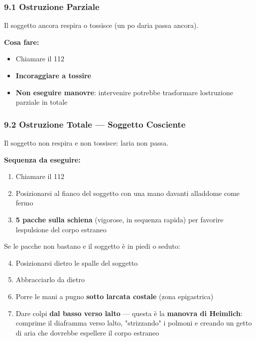 \documentclass[a4paper,11pt]{article}
\providecommand{\tightlist}{%
  \setlength{\itemsep}{0pt}\setlength{\parskip}{0pt}}
\begin{document}
\subsubsection{9.1 Ostruzione Parziale}\label{ostruzione-parziale}

Il soggetto ancora respira o tossisce (un po\textquotesingle{}
d\textquotesingle aria passa ancora).

\textbf{Cosa fare:}

\begin{itemize}
      \tightlist
      \item
            Chiamare il 112
      \item
            \textbf{Incoraggiare a tossire}
      \item
            \textbf{Non eseguire manovre}: intervenire potrebbe trasformare
            l\textquotesingle ostruzione parziale in totale
\end{itemize}

\subsubsection{9.2 Ostruzione Totale --- Soggetto
      Cosciente}\label{ostruzione-totale-soggetto-cosciente}

Il soggetto non respira e non tossisce: l\textquotesingle aria non
passa.

\textbf{Sequenza da eseguire:}

\begin{enumerate}
      \tightlist
      \item
            Chiamare il 112
      \item
            Posizionarsi al fianco del soggetto con una mano davanti
            all\textquotesingle addome come fermo
      \item
            \textbf{5 pacche sulla schiena} (vigorose, in sequenza rapida) per
            favorire l\textquotesingle espulsione del corpo estraneo
\end{enumerate}

Se le pacche non bastano e il soggetto è in piedi o seduto:

\begin{enumerate}
      \setcounter{enumi}{3}
      \tightlist
      \item
            Posizionarsi dietro le spalle del soggetto
      \item
            Abbracciarlo da dietro
      \item
            Porre le mani a pugno \textbf{sotto l\textquotesingle arcata costale}
            (zona epigastrica)
      \item
            Dare colpi \textbf{dal basso verso l\textquotesingle alto} --- questa
            è la \textbf{manovra di Heimlich}: comprime il diaframma verso
            l\textquotesingle alto, "strizzando" i polmoni e creando un getto di
            aria che dovrebbe espellere il corpo estraneo
\end{enumerate}
\end{document}
